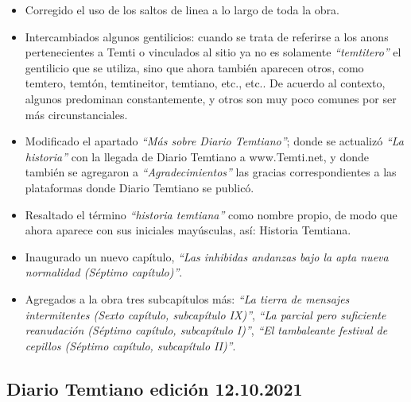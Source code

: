 \documentclass[
]{book}
\begin{document}
\begin{itemize}
\item
  Corregido el uso de los saltos de linea a lo largo de toda la obra.
\item
  Intercambiados algunos gentilicios: cuando se trata de referirse a los anons pertenecientes a Temti o vinculados al sitio ya no es solamente \emph{``temtitero''} el gentilicio que se utiliza, sino que ahora también aparecen otros, como temtero, temtón, temtineitor, temtiano, etc., etc.. De acuerdo al contexto, algunos predominan constantemente, y otros son muy poco comunes por ser más circunstanciales.
\item
  Modificado el apartado \emph{``Más sobre Diario Temtiano''}; donde se actualizó \emph{``La historia''} con la llegada de Diario Temtiano a www.Temti.net, y donde también se agregaron a \emph{``Agradecimientos''} las gracias correspondientes a las plataformas donde Diario Temtiano se publicó.
\item
  Resaltado el término \emph{``historia temtiana''} como nombre propio, de modo que ahora aparece con sus iniciales mayúsculas, así: Historia Temtiana.
\item
  Inaugurado un nuevo capítulo, \emph{``Las inhibidas andanzas bajo la apta nueva normalidad (Séptimo capítulo)''}.
\item
  Agregados a la obra tres subcapítulos más: \emph{``La tierra de mensajes intermitentes (Sexto capítulo, subcapítulo IX)''}, \emph{``La parcial pero suficiente reanudación (Séptimo capítulo, subcapítulo I)''}, \emph{``El tambaleante festival de cepillos (Séptimo capítulo, subcapítulo II)''}.
\end{itemize}

\hypertarget{diario-temtiano-ediciuxf3n-12.10.2021}{%
\subsection*{Diario Temtiano edición 12.10.2021}\label{diario-temtiano-ediciuxf3n-12.10.2021}}
\end{document}
